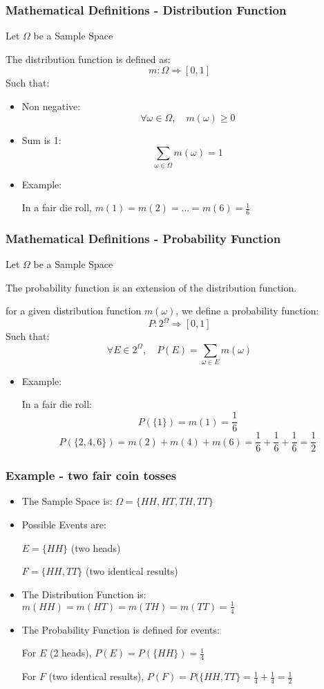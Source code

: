 \documentclass{beamer}
\begin{document}

\begin{frame}
\frametitle{Mathematical Definitions - Distribution Function}
Let $\Omega$ be a Sample Space

The distribution function is defined as:
$$ m : \Omega \Rightarrow [0,1] $$
Such that:
\begin{itemize}
\item Non negative:
$$ \forall \omega \in \Omega, \quad m(\omega) \geq 0$$
\item Sum is 1:
$$ \sum_{\omega \in \Omega}{m(\omega)} = 1$$

\item Example:

In a fair die roll, $m(1)=m(2)=...=m(6)=\frac{1}{6}$
\end{itemize}
\end{frame}


\begin{frame}
\frametitle{Mathematical Definitions - Probability Function}
Let $\Omega$ be a Sample Space

The probability function is an extension of the distribution function.

for a given distribution function $m(\omega)$, we define a probability function:
$$ P : 2^{\Omega} \Rightarrow [0,1] $$
Such that:
$$ \forall E \in 2^{\Omega}, \quad P(E)=\sum_{\omega \in E}{m(\omega)}$$
\begin{itemize}
\item Example:

In a fair die roll:
$$P(\{1\})=m(1)=\frac{1}{6}$$
$$P(\{2,4,6\})=m(2)+m(4)+m(6)=\frac{1}{6}+\frac{1}{6}+\frac{1}{6}=\frac{1}{2}$$
\end{itemize}
\end{frame}


\begin{frame}
\frametitle{Example - two fair coin tosses}
\begin{itemize}
\item The Sample Space is: $\Omega=\{HH,HT,TH,TT\}$
\item Possible Events are: 

$E = \{HH\}$ (two heads)

$ F = \{HH,TT\}$ (two identical results)
\item The Distribution Function is: $m(HH)=m(HT)=m(TH)=m(TT)=\frac{1}{4}$
\item The Probability Function is defined for events:

For $E$ (2 heads), $P(E)=P(\{HH\})=\frac{1}{4}$

For $F$ (two identical results), $P(F)=P(\{HH,TT\}=\frac{1}{4}+\frac{1}{4}=\frac{1}{2}$

\end{itemize}
\end{frame}
\end{document}
